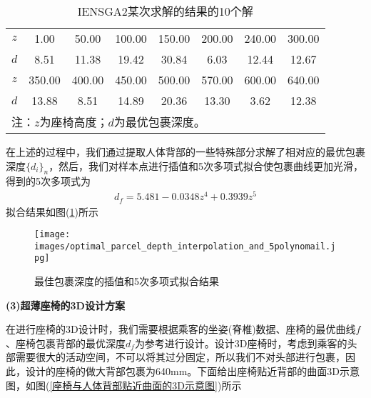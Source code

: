         \begin{table}[H]
        \centering
        \caption{IENSGA2某次求解的结果的10个解}
        \label{IENSGA2某次求解的结果的10个解}
        \begin{tabular}{cccccccc}
        \toprule
        $z$  & 1.00   & 50.00 &  100.00 & 150.00 & 200.00 & 240.00 & 300.00\\
        $d$  & 8.51   & 11.38 &  19.42  & 30.84  & 6.03   & 12.44  & 12.67 \\
        \hline
        \hline
        $z$  & 350.00 & 400.00&  450.00 & 500.00 & 570.00 & 600.00 & 640.00\\
        $d$  & 13.88  & 8.51  &  14.89  & 20.36  & 13.30  & 3.62   & 12.38 \\
        \bottomrule
        \multicolumn{8}{l}{\footnotesize 注：$z$为座椅高度；$d$为最优包裹深度。}\\
        \end{tabular}
        \end{table}
            \par
            在上述的过程中，我们通过提取人体背部的一些特殊部分求解了相对应的最优包裹深度$\{d_i \}_n$，然后，我们对样本点进行插值和5次多项式拟合使包裹曲线更加光滑，得到的5次多项式为
            \begin{align*}
            d_f = 5.481-0.0348z^4+0.3939z^5
            \end{align*}
            拟合结果如图(\ref{最佳包裹深度的插值和5次多项式拟合结果})所示
            \begin{figure}[H]
            \centering
            \texttt{[image: images/optimal\_parcel\_depth\_interpolation\_and\_5polynomail.jpg]}
            \caption{最佳包裹深度的插值和5次多项式拟合结果}
            \label{最佳包裹深度的插值和5次多项式拟合结果}
            \end{figure}
            \par
            \textbf{(3)超薄座椅的3D设计方案}
            \par
            在进行座椅的3D设计时，我们需要根据乘客的坐姿(脊椎)数据、座椅的最优曲线$f$、座椅包裹背部的最优深度$d_f$为参考进行设计。设计3D座椅时，考虑到乘客的头部需要很大的活动空间，不可以将其过分固定，所以我们不对头部进行包裹，因此，设计的座椅的做大背部包裹为640mm。下面给出座椅贴近背部的曲面3D示意图，如图(\ref{座椅与人体背部贴近曲面的3D示意图})所示
